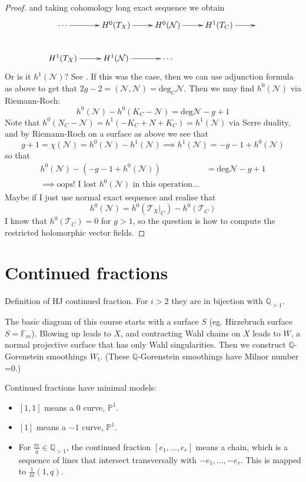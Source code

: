 \begin{proof}
and taking cohomology long exact sequence we obtain
$$
\xymatrix{
\cdots\ar[r]&H^{0}(T_X)\ar[r]&H^{0}(\mathcal{N})\ar[r]&H^{1}(T_C)\ar[r]&\\
H^{1}(T_X)\ar[r]&H^{1}(\mathcal{N})\ar[r]& \cdots
}
$$
\medskip\noindent
Or is it $h^1(\mathcal{N})$? See \cite{HarrMorr}. If this was the case, then we
can use adjunction formula as above to get that
$2g-2=(\mathcal{N},\mathcal{N})=\text{deg}_C \mathcal{N}$. Then we may find
$h^0(\mathcal{N})$ via Riemann-Roch:
$$
h^0(\mathcal{N})-h^0(K_C-\mathcal{N})=\text{deg}\mathcal{N}-g+1
$$
Note that $h^0(N_C-\mathcal{N})=h^1(-K_C+N+K_C)=h^1(\mathcal{N})$ via Serre
duality, and by Riemann-Roch on a surface as above we see that
$$
g+1=\chi(\mathcal{N})=h^0(\mathcal{N})-h^1(\mathcal{N})
\implies h^1(\mathcal{N})=-g-1+h^0(\mathcal{N})
$$
so that
\begin{align*}
h^0(\mathcal{N})-(-g-1+h^0(\mathcal{N}))&=\text{deg}\mathcal{N}-g+1\\
\implies \text{oops! I lost $h^0(\mathcal{N})$ in this operation…}
\end{align*}
Maybe if I just use normal exact sequence and realise that
$$
h^0(\mathcal{N})=h^0(\mathcal{T}_X|_{C})-h^0(\mathcal{T}_C)
$$
I know that $h^0(\mathcal{T}_C)=0$ for $g>1$, so the question is how to compute
the restricted holomorphic vector fields.
\end{proof}

\section{Continued fractions}
\label{section-continued-fractions}

Definition of HJ continued fraction. For $i>2$ they are in bijection with
$\mathbb{Q}_{>1}$.

The basic diagram of this course starts with a surface $S$ (eg. Hirzebruch
surface $S=\mathbb{F}_m$). Blowing up leads to $X$, and contracting Wahl chains
on $X$ leads to $W$, a normal projective surface that has only Wahl
singularities. Then we construct $\mathbb{Q}$-Gorenstein smoothings $W_t$.
(These  $\mathbb{Q}$-Gorenstein smoothings have Milnor number =0.)

Continued fractions have minimal models:
\begin{itemize}
\item $[1,1]$ means a 0 curve,  $\mathbb{P}^1$.
\item $[1]$ means a  $-1$ curve,  $\mathbb{P}^1$.
\item For $\frac{m}{q}\in\mathbb{Q}_{>1}$, the continued fraction
$[e_1,\ldots,e_r]$ means a chain, which is a sequence of lines that intersect
transversally with $-e_1,\ldots,-e_r$. This is mapped to $\frac{1}{m}(1,q)$.
\end{itemize}

